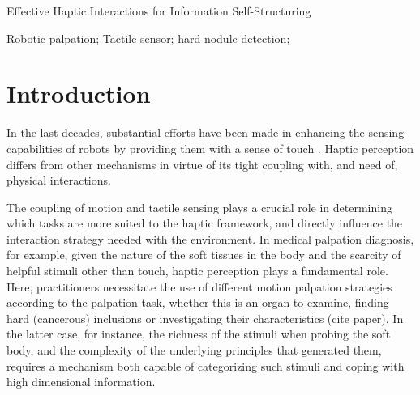 \documentclass[]{interact}
\theoremstyle{plain}%
\theoremstyle{definition}
\theoremstyle{remark}
\begin{document}
\newcommand{\DelP}[1]{\textcolor{red}{\st{#1}}}
\newcommand{\AddP}[1]{\textcolor{blue}{#1}}
\newcommand{\NoteP}[1]{\textcolor{green}{#1}}
\newcommand{\ULsubfloat}[2][\empty]%

\title{Effective Haptic Interactions for Information Self-Structuring}


\author{
}

\maketitle

\begin{abstract}
This paper presents ....
We explore different robotic palpation strategies and we evaluate their capabilities to find invariant features (depth, size) of hard inclusions in a soft phantom.
We used PCA and KNN for clustering the data ...
The results show that ...
\end{abstract}

\begin{keywords}
Robotic palpation; Tactile sensor; hard nodule detection; 
\end{keywords}

\section{Introduction}

In the last decades, substantial efforts have been made in enhancing the sensing capabilities of robots by providing them with a sense of touch \cite{dahiya_tactile_2010}. Haptic perception differs from other mechanisms in virtue of its tight coupling with, and need of, physical interactions. 

The coupling of motion and tactile sensing plays a crucial role in determining which tasks are more suited to the haptic framework, and directly influence the interaction strategy needed with the environment. In medical palpation diagnosis, for example, given the nature of the soft tissues in the body and the scarcity of helpful stimuli other than touch, haptic perception plays a fundamental role. Here, practitioners necessitate the use of different motion palpation strategies according to the palpation task, whether this is an organ to examine, finding hard (cancerous) inclusions or investigating their characteristics (cite paper). In the latter case, for instance, the richness of the stimuli when probing the soft body, and the complexity of the underlying principles that generated them, requires a mechanism both capable of categorizing such stimuli and coping with high dimensional information.
\end{document}
